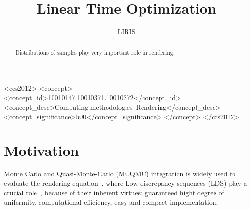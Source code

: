 \documentclass[review]{acmsiggraph}
\title{Linear Time Optimization}
\author{LIRIS}
\begin{document}


%

\maketitle


\begin{abstract}

Distributions of samples play very important role in rendering,
\end{abstract}

\begin{CCSXML}
<ccs2012>
<concept>
<concept_id>10010147.10010371.10010372</concept_id>
<concept_desc>Computing methodologies~Rendering</concept_desc>
<concept_significance>500</concept_significance>
</concept>
</ccs2012>
\end{CCSXML}

\keywordlist

\conceptlist



\section{Motivation}
\label{sec:Motivation}

Monte Carlo and Quasi-Monte-Carlo (MCQMC) integration is widely used
to evaluate the rendering equation~\cite{Pharr2016}, where
Low-discrepancy sequences (LDS) play a crucial
role~\cite{Niederreiter1992,Lemieux2009}, because of their inherent
virtues: guaranteed hight degree of uniformity, computational
efficiency, easy and compact implementation.





\end{document}
